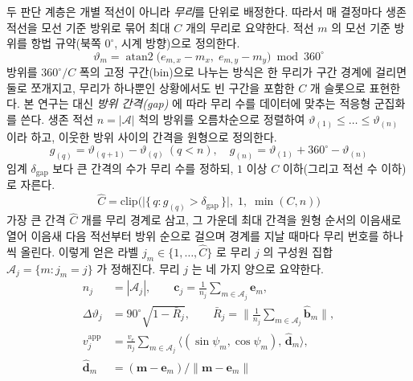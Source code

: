 두 판단 계층은 개별 적선이 아니라 \emph{무리}를 단위로 배정한다. 따라서 매 결정마다 생존
적선을 모선 기준 방위로 묶어 최대 $C$ 개의 무리로 요약한다. 적선 $m$ 의 모선 기준 방위를
항법 규약(북쪽 $0^\circ$, 시계 방향)으로 정의한다.
\begin{equation}
\vartheta_m = \operatorname{atan2}\!\big(e_{m,x} - m_x,\; e_{m,y} - m_y\big) \bmod 360^\circ
\label{eq:bearing}
\end{equation}
방위를 $360^\circ / C$ 폭의 고정 구간(bin)으로 나누는 방식은 한 무리가 구간 경계에 걸리면
둘로 쪼개지고, 무리가 하나뿐인 상황에서도 빈 구간을 포함한 $C$ 개 슬롯으로 표현한다. 본 연구는 대신
\emph{방위 간격(gap)} 에 따라 무리 수를 데이터에 맞추는 적응형 군집화를 쓴다. 생존 적선
$n = |\mathcal{A}|$ 척의 방위를 오름차순으로 정렬하여 $\vartheta_{(1)} \le \dots \le
\vartheta_{(n)}$ 이라 하고, 이웃한 방위 사이의 간격을 원형으로 정의한다.
\begin{equation}
g_{(q)} = \vartheta_{(q+1)} - \vartheta_{(q)}\ (q < n), \quad
g_{(n)} = \vartheta_{(1)} + 360^\circ - \vartheta_{(n)}
\label{eq:gap}
\end{equation}
임계 $\delta_{\mathrm{gap}}$ 보다 큰 간격의 수가 무리 수를 정하되, $1$ 이상 $C$ 이하(그리고
적선 수 이하)로 자른다.
\begin{equation}
\hat{C} = \mathrm{clip}\!\Big(\big|\{\, q : g_{(q)} > \delta_{\mathrm{gap}} \,\}\big|,\; 1,\; \min(C, n)\Big)
\label{eq:ncluster}
\end{equation}
가장 큰 간격 $\hat{C}$ 개를 무리 경계로 삼고, 그 가운데 최대 간격을 원형 순서의 이음새로
열어 이음새 다음 적선부터 방위 순으로 걸으며 경계를 지날 때마다 무리 번호를 하나씩
올린다. 이렇게 얻은 라벨 $j_m \in \{1, \dots, \hat{C}\}$ 로 무리 $j$ 의 구성원 집합
$\mathcal{A}_j = \{m : j_m = j\}$ 가 정해진다. 무리 $j$ 는 네 가지 양으로 요약한다.
\begin{equation}
\begin{aligned}
n_j &= |\mathcal{A}_j|, \qquad
\mathbf{c}_j = \frac{1}{n_j} \sum_{m \in \mathcal{A}_j} \mathbf{e}_m,\\
\Delta\vartheta_j &= 90^\circ \sqrt{1 - \bar{R}_j}, \qquad
\bar{R}_j = \Big\lVert \frac{1}{n_j} \sum_{m \in \mathcal{A}_j} \hat{\mathbf{b}}_m \Big\rVert,\\[2pt]
v^{\mathrm{app}}_j &= \frac{v_e}{n_j} \sum_{m \in \mathcal{A}_j}
  \big\langle (\sin\psi_m, \cos\psi_m),\, \hat{\mathbf{d}}_m \big\rangle,\\
\hat{\mathbf{d}}_m &= (\mathbf{m} - \mathbf{e}_m) / \lVert \mathbf{m} - \mathbf{e}_m \rVert
\end{aligned}
\label{eq:clustersum}
\end{equation}
